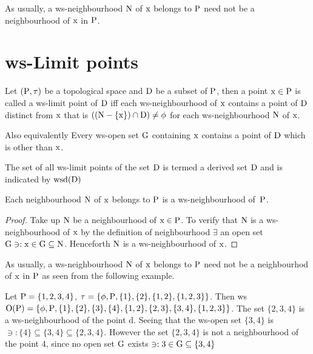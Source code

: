 \begin{rem}\label{rem2.5.5} 
As usually, a ws-neighbourhood $\mathrm{N}$ of $\mathrm{x}$ belongs to $\mathrm{P}$ need not be a neighbourhood of $\mathrm{x}$ in $\mathrm{P}$.
\end{rem}

\section{ws-Limit points}\label{sec2.6}

\begin{dfn}\label{defi2.6.1}
Let $(\mathrm{P}, \tau)$ be a topological space and $\mathrm{D}$ be a subset of $\mathrm{P}$, then a point $\mathrm{x}\in \mathrm{P}$ is called a ws-limit point of $\mathrm{D}$ iff each ws-neighbourhood of $\mathrm{x}$ contains a point of $\mathrm{D}$ distinct from $\mathrm{x}$ that is $((\mathrm{N}-\{\mathrm{x}\})\cap \mathrm{D})\neq \phi$ for each ws-neighbourhood $\mathrm{N}$ of $\mathrm{x}$.
\end{dfn}

Also equivalently Every ws-open set $\mathrm{G}$ containing $\mathrm{x}$ contains a point of $\mathrm{D}$ which is other than $\mathrm{x}$.

\begin{dfn}\label{defi2.6.2}
The set of all ws-limit points of the set $\mathrm{D}$ is termed a derived set $\mathrm{D}$ and is indicated by $\mathrm{wsd}(\mathrm{D})$
\end{dfn}

\begin{thm}\label{thm2.6.3}
Each neighbourhood $\mathrm{N}$ of $\mathrm{x}$ belongs to $\mathrm{P}$ is a ws-neighbourhood of~$\mathrm{P}$.
\end{thm}

\begin{proof}
Take up $\mathrm{N}$ be a neighbourhood of $\mathrm{x}\in \mathrm{P}$. To verify that $\mathrm{N}$ is a ws-neighbour\-hood of $\mathrm{x}$ by the definition of neighbourhood $\exists$ an open set $\mathrm{G} \ni: \mathrm{x}\in\mathrm{G}\subseteq \mathrm{N}$. Henceforth $\mathrm{N}$ is a ws-neighbourhood of $\mathrm{x}$.
\end{proof}

\begin{rem}\label{rem2.6.4}
As usually, a ws-neighbourhood $\mathrm{N}$ of $\mathrm{x}$ belongs to $\mathrm{P}$ need not be a neighbourhod of $\mathrm{x}$ in $\mathrm{P}$ as seen from the following example.
\end{rem}

\begin{exm}\label{exam2.6.5}
Let $\mathrm{P} = \{1, 2, 3, 4 \}$, $\tau = \{\phi, \mathrm{P}, \{1\}, \{2\}, \{1, 2\}, \{1, 2, 3\}\}$. Then ws$\mathrm{O}(\mathrm{P})= \{\phi, \mathrm{P}, \{1\}, \{2\}, \{3\}, \{4\},\{1, 2\},\{2, 3\}, \{3, 4\}, \{1, 2, 3\}\}$. The set $\{2, 3, 4\}$ is a ws-neighbourhood of the point d. Seeing that the ws-open set $\{3, 4\}$ is $\ni: \{4\}\subseteq \{3, 4\} \subseteq \{2, 3, 4\}$. However the set $\{2, 3, 4\}$ is not a neighbourhood of the point 4, since no open set $\mathrm{G}$ exists $\ni: 3\in \mathrm{G}\subseteq \{3, 4\}$
\end{exm}
